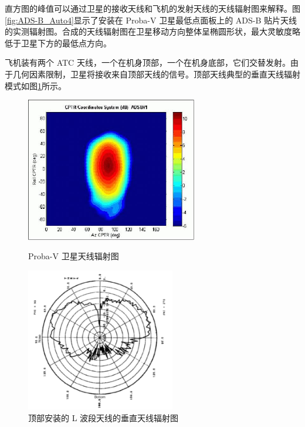
直方图的峰值可以通过卫星的接收天线和飞机的发射天线的天线辐射图来解释。图\ref{fig:ADS-B_Auto4}显示了安装在 Proba-V 卫星最低点面板上的 ADS-B 贴片天线的实测辐射图。合成的天线辐射图在卫星移动方向整体呈椭圆形状，最大灵敏度略低于卫星下方的最低点方向。

飞机装有两个 ATC 天线，一个在机身顶部，一个在机身底部，它们交替发射。由于几何因素限制，卫星将接收来自顶部天线的信号。顶部天线典型的垂直天线辐射模式如图\ref{fig:antenna_of_plane}所示。

\begin{figure}[!htb]
\centering
\begin{minipage}[t]{0.48\textwidth}
\centering
\includegraphics[width=7.5cm]{pic/ADS-B_Auto4.jpeg}
\caption{Proba-V 卫星天线辐射图\protect\footnotemark}
\label{fig:ADS-B_Auto4}
\end{minipage}
\begin{minipage}[t]{0.48\textwidth}
\centering
\includegraphics[width=6.5cm]{pic/antenna_of_plane.png}
\caption{顶部安装的 L 波段天线的垂直天线辐射图\protect\footnotemark}
\label{fig:antenna_of_plane}
\end{minipage}
\end{figure}


